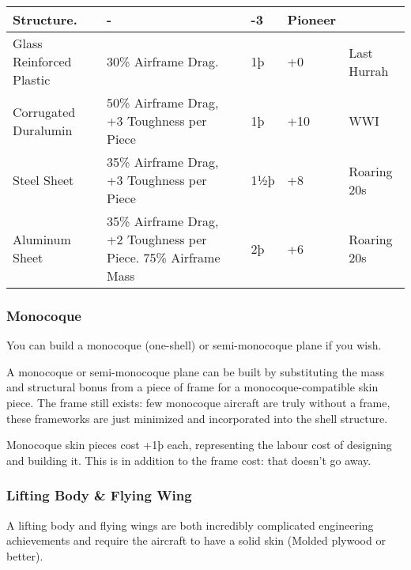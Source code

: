 \documentclass{article}
\begin{document}
\begin{tabular}{|l|l|l|l|l|}
  Structure.                   & -                                                       & -3         & Pioneer               \\\hline
  Glass Reinforced Plastic     & 30\% Airframe Drag.                                     & 1þ         & +0          & Last
  Hurrah                                                                                                                      \\\hline
  Corrugated Duralumin         & 50\% Airframe Drag, +3 Toughness per Piece              & 1þ         &
  +10                          & WWI                                                                                          \\\hline
  Steel Sheet                  & 35\% Airframe Drag, +3 Toughness per Piece              & 1½þ        & +8          &
  Roaring 20s                                                                                                                 \\\hline
  Aluminum Sheet               & 35\% Airframe Drag, +2 Toughness per Piece. 75\%
  Airframe Mass                & 2þ                                                      & +6         & Roaring 20s           \\\hline
\end{tabular}

\subsubsection{Monocoque}
\label{_Monocoque}

You can build a monocoque (one-shell) or semi-monocoque plane if you
wish.

A monocoque or semi-monocoque plane can be built by substituting the
mass and structural bonus from a piece of frame for a
monocoque-compatible skin piece. The frame still exists: few monocoque
aircraft are truly without a frame, these frameworks are just minimized
and incorporated into the shell structure.

Monocoque skin pieces cost +1þ each, representing the labour cost of
designing and building it. This is in addition to the frame cost: that
doesn't go away.

\subsubsection{Lifting Body \& Flying Wing}
\label{_Lifting Body \& Flying Wing}

A lifting body and flying wings are both incredibly complicated
engineering achievements and require the aircraft to have a solid skin
(Molded plywood or better).
\end{document}
